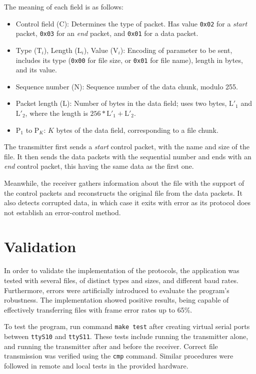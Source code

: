 \documentclass[a4paper, 11pt]{report}
\begin{document}
The meaning of each field is as follows:
\begin{itemize}
	\itemsep0em
	\item Control field (C): Determines the type of packet. Has value \texttt{0x02} for a \textit{start} packet, \texttt{0x03} for an \textit{end} packet, and \texttt{0x01} for a data packet.
	\item Type ($\text{T}_i$), Length ($\text{L}_i$), Value ($\text{V}_i$): Encoding of parameter to be sent, includes its type (\texttt{0x00} for file size, or \texttt{0x01} for file name), length in bytes, and its value.
	\item Sequence number (N): Sequence number of the data chunk, modulo 255.
	\item Packet length ($\text{L}$): Number of bytes in the data field; uses two bytes, $\text{L}'_1$ and $\text{L}'_2$, where the length is $256*\text{L}'_1 + \text{L}'_2$.
	\item $\text{P}_1$ to $\text{P}_K$: $K$ bytes of the data field, corresponding to a file chunk.
\end{itemize}

The transmitter first sends a \textit{start} control packet, with the name and size of the file.
It then sends the data packets with the sequential number and ends with an \textit{end} control packet,
this having the same data as the first one.

Meanwhile, the receiver gathers information about the file with the support of the control packets and reconstructs the original file from the data packets. 
It also detects corrupted data, in which case it exits with error as its protocol does not establish an error-control method.

\section{Validation} \label{sec:Validation}

In order to validate the implementation of the protocols, the application was tested with several files, of distinct types and sizes, and different baud rates. 
Furthermore, errors were artificially introduced to evaluate the program's robustness.
The implementation showed positive results, being capable of effectively transferring files with frame error rates up to 65\%.

To test the program, run command \texttt{make test} after creating virtual serial ports between \texttt{ttyS10} and \texttt{ttyS11}.
These tests include running the transmitter alone, and running the transmitter after and before the receiver.
Correct file transmission was verified using the \texttt{cmp} command.
Similar procedures were followed in remote and local tests in the provided hardware.
\end{document}
